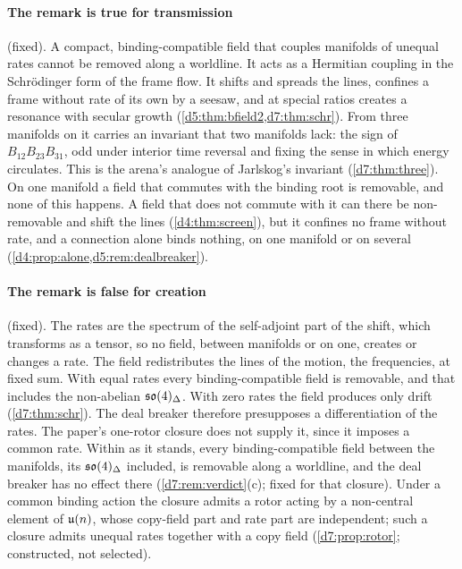 \paragraph{The remark is true for transmission} (fixed). A compact, binding-compatible field that couples manifolds of unequal rates cannot be removed
along a worldline. It acts as a Hermitian coupling in the Schr\"odinger form of the frame flow. It shifts and spreads the lines, confines a frame without
rate of its own by a seesaw, and at special ratios creates a resonance with secular growth (\cref{d5:thm:bfield2,d7:thm:schr}). From three
manifolds on it carries an invariant that two manifolds lack: the sign of $B_{12}B_{23}B_{31}$, odd under interior time reversal and fixing the
sense in which energy circulates. This is the arena's analogue of Jarlskog's invariant (\cref{d7:thm:three}). On one manifold a field that commutes with
the binding root is removable, and none of this happens. A field that does not commute with it can there be non-removable and shift the lines
(\cref{d4:thm:screen}), but it confines no frame without rate, and a connection alone binds nothing, on one manifold or on several
(\cref{d4:prop:alone,d5:rem:dealbreaker}).

\paragraph{The remark is false for creation} (fixed). The rates are the spectrum of the self-adjoint part of the shift, which transforms as a
tensor, so no field, between manifolds or on one, creates or changes a rate. The field redistributes the lines of the motion, the frequencies, at fixed sum. With equal
rates every binding-compatible field is removable, and that includes the non-abelian $\mathfrak{so}(4)_\Delta$. With zero rates the field produces only drift
(\cref{d7:thm:schr}). The deal breaker therefore presupposes a differentiation of the rates. The paper's one-rotor closure does not supply it,
since it imposes a common rate. Within \cite{ES17} as it stands, every binding-compatible field between the manifolds, its $\mathfrak{so}(4)_\Delta$ included, is removable along a worldline, and the deal breaker has no effect there (\cref{d7:rem:verdict}(c); fixed for that closure). Under a common binding action the closure admits a rotor acting by a non-central element of $\mathfrak{u}(n)$, whose
copy-field part and rate part are independent; such a closure admits unequal rates together with a copy field (\cref{d7:prop:rotor}; constructed,
not selected).


